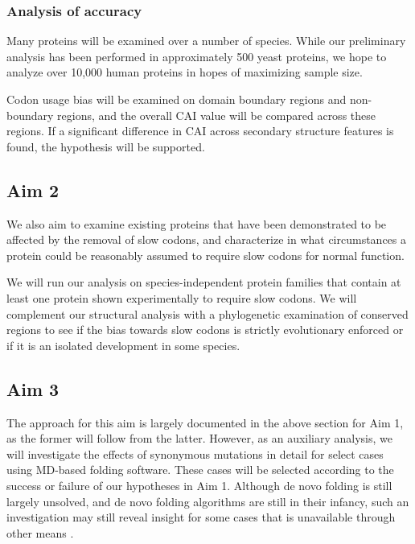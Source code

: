 \documentclass[11pt]{nih}
\newcommand{\todo}[1]{
\addcontentsline{tdo}{todo}{\protect{#1}}
\textcolor{red}{TODO: #1}
}
\begin{document}





\subsubsection{Analysis of accuracy}
Many proteins will be examined over a number of species. While our preliminary analysis has been performed in approximately 500 yeast proteins, we hope to analyze over 10,000 human proteins in hopes of maximizing sample size.

Codon usage bias will be examined on domain boundary regions and non-boundary regions, and the overall CAI value will be compared across these regions. If a significant difference in CAI across secondary structure features is found, the hypothesis will be supported.
\cite{Liu:2011p8245}


\subsection{Aim 2}
We also aim to examine existing proteins that have been demonstrated to be affected by the removal of slow codons, and characterize in what circumstances a protein could be reasonably assumed to require slow codons for normal function.

We will run our analysis on species-independent protein families that contain at least one protein shown experimentally to require slow codons. We will complement our structural analysis with a phylogenetic examination of conserved regions to see if the bias towards slow codons is strictly evolutionary enforced or if it is an isolated development in some species.

\subsection{Aim 3}

The approach for this aim is largely documented in the above section for Aim 1, as the former will follow from the latter. However, as an auxiliary analysis, we will investigate the effects of synonymous mutations in detail for select cases using MD-based folding software. These cases will be selected according to the success or failure of our hypotheses in Aim 1. Although de novo folding is still largely unsolved, and de novo folding algorithms are still in their infancy, such an investigation may still reveal insight for some cases that is unavailable through other means \cite{Zhang:2008p3335}.




 

\appendix
\end{document}
